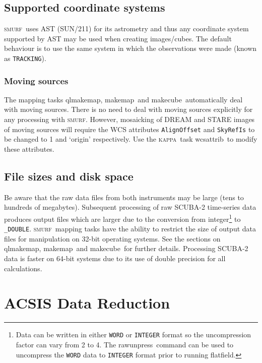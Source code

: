 \documentclass[twoside,11pt]{article}
\newcommand{\xref}[3]{#1}
\newcommand{\xlabel}[1]{}
\renewcommand{\_}{\texttt{\symbol{95}}}
\newcommand{\KAPPA}{\textsc{kappa}}
\newcommand{\SMURF}{\textsc{smurf}}
\newcommand{\astref}{\xref{SUN/211}{sun211}{}}
\newcommand{\task}[1]{\textsf{#1}}
\newcommand{\makecube}{\xref{\task{makecube}}{sun258}{MAKECUBE}}
\newcommand{\qlmakemap}{\xref{\task{qlmakemap}}{sun258}{QLMAKEMAP}}
\newcommand{\rawunpress}{\xref{\task{rawunpress}}{sun258}{RAWUNPRESS}}
\newcommand{\flatfield}{\xref{\task{flatfield}}{sun258}{FLATFIELD}}
\newcommand{\makemap}{\xref{\task{makemap}}{sun258}{MAKEMAP}}
\newcommand{\wcsattrib}{\xref{\task{wcsattrib}}{sun95}{WCSATTRIB}}
\newcommand{\aparam}[1]{\texttt{#1}}     %
\begin{document}
\subsection{Supported coordinate systems}

\SMURF\ uses AST (\astref) for its astrometry and thus any coordinate
system supported by AST may be used when creating images/cubes. The
default behaviour is to use the same system in which the observations
were made (known as \aparam{TRACKING}).

\subsubsection{Moving sources}

The mapping tasks \qlmakemap, \makemap\ and \makecube\ automatically
deal with moving sources. There is no need to deal with moving sources
explicitly for any processing with \SMURF. However, mosaicking of
DREAM and STARE images of moving sources will require the WCS
attributes \verb+AlignOffset+ and \verb+SkyRefIs+ to be changed to 1
and `origin' respectively. Use the \KAPPA\ task \wcsattrib\ to
modify these attributes.

\subsection{File sizes and disk space}

Be aware that the raw data files from both instruments may be large
(tens to hundreds of megabytes). Subsequent processing of raw SCUBA-2
time-series data produces output files which are larger due to the
conversion from integer\footnote{Data can be written in either
  \texttt{\_WORD} or \texttt{\_INTEGER} format so the uncompression
  factor can vary from 2 to 4. The \rawunpress\ command can be used to
  uncompress the \texttt{\_WORD} data to \texttt{\_INTEGER} format
  prior to running \flatfield.}  to \verb+_DOUBLE+. \SMURF\ mapping
tasks have the ability to restrict the size of output data files for
manipulation on 32-bit operating systems. See the sections on
\qlmakemap, \makemap\ and \makecube\ for further details. Processing
SCUBA-2 data is faster on 64-bit systems due to its use of double
precision for all calculations.

\section{\xlabel{acsis}ACSIS Data Reduction\label{se:acsisdr}}
\end{document}
